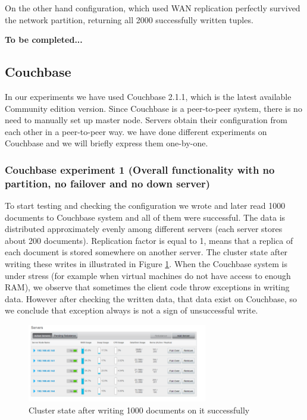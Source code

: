 \documentclass[a4paper]{article}
\begin{document}
On the other hand configuration, which used WAN replication perfectly survived the network partition, returning all 2000 successfully written tuples.

{\bf To be completed...}

\subsection{Couchbase}

In our experiments we have used Couchbase 2.1.1, which is the latest available Community edition version. 
Since Couchbase is a peer-to-peer system, there is no need to manually set up master node. 
Servers obtain their configuration from each other in a peer-to-peer way.
we have done different experiments on Couchbase and we will briefly express them one-by-one.

\subsubsection{Couchbase experiment 1 (Overall functionality with no partition, no failover and no down server)}
To start testing and checking the configuration we wrote and later read 1000 documents to Couchbase system and all of them were successful. 
The data is distributed approximately evenly among different servers (each server stores about 200 documents).
Replication factor is equal to 1, means that a replica of each document is stored somewhere on another server.
The cluster state after writing these writes in illustrated in Figure \ref{fig:diagram1}.
When the Couchbase system is under stress (for example when virtual machines do not have access to enough RAM), we observe that sometimes the client code throw exceptions in writing data.
However after checking the written data, that data exist on Couchbase, so we conclude that exception always is not a sign of unsuccessful write.  

\begin{figure}[h!]
	\centering
	\includegraphics[width=0.7\textwidth]{diagram1}
	\caption{Cluster state after writing 1000 documents on it successfully}
	\label{fig:diagram1}
\end{figure}
\end{document}
